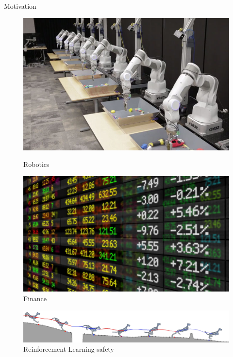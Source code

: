 \documentclass{beamer}
\begin{document}
\begin{frame}{Motivation}
\begin{figure}
    \centering
    \begin{minipage}{0.45\textwidth}
        \centering
        \includegraphics[width=0.87\linewidth]{../gfx/Deep-Learning-for-Robots.jpg}
        \caption{Robotics}
    \end{minipage}\hfill
    \begin{minipage}{0.45\textwidth}
        \centering
        \includegraphics[width=\linewidth]{../gfx/stock_market.jpg}
        \caption{Finance}
    \end{minipage}
\end{figure}

\begin{figure}
\includegraphics[width=\linewidth]{../gfx/running_tiger.png}
\caption{Reinforcement Learning safety}
\end{figure}


\end{frame}
\end{document}
